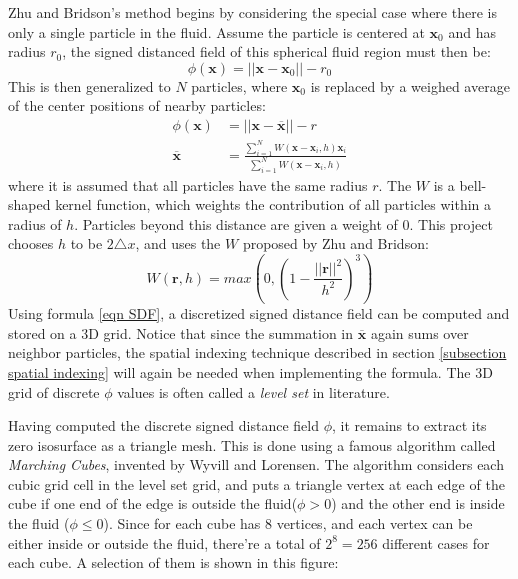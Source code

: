 Zhu and Bridson's method\cite{zhu2005animating} begins by considering the special case where there is only a single particle in the fluid. Assume the particle is centered at $\textbf{x}_0$ and has radius $r_0$, the signed distanced field of this spherical fluid region must then be:
$$
\phi(\textbf{x}) = ||\textbf{x}-\textbf{x}_0|| - r_0
$$
This is then generalized to $N$ particles, where $\textbf{x}_0$ is replaced by a weighed average of the center positions of nearby particles:
\begin{equation}
    \label{eqn SDF}
    \begin{aligned}
        \phi(\textbf{x}) &= ||\textbf{x}-\overline{\textbf{x}}|| - r \\
        \overline{\textbf{x}}&= \frac{\sum_{i=1}^{N} W(\textbf{x}-\textbf{x}_i,h)\textbf{x}_i}{\sum_{i=1}^{N} W(\textbf{x}-\textbf{x}_i,h)}
    \end{aligned}
\end{equation}
where it is assumed that all particles have the same radius $r$. The $W$ is a bell-shaped kernel function, which weights the contribution of all particles within a radius of $h$. Particles beyond this distance are given a weight of $0$. This project chooses $h$ to be $2\triangle x$, and uses the $W$ proposed by Zhu and Bridson:
$$
W(\textbf{r},h) = max(0,(1-\frac{||\textbf{r}||^2}{h^2})^3) 
$$
Using formula \ref{eqn SDF}, a discretized signed distance field can be computed and stored on a 3D grid. Notice that since the summation in $\overline{\textbf{x}}$ again sums over neighbor particles, the spatial indexing technique described in section \ref{subsection spatial indexing} will again be needed when implementing the formula. The 3D grid of discrete $\phi$ values is often called a \textit{level set} in literature\cite{bridson2015fluid}.


Having computed the discrete signed distance field $\phi$, it remains to extract its zero isosurface as a triangle mesh. This is done using a famous algorithm called \textit{Marching Cubes}, invented by Wyvill\cite{wyvill1986soft} and Lorensen\cite{lorensen1987marching}. The algorithm considers each cubic grid cell in the level set grid, and puts a triangle vertex at each edge of the cube if one end of the edge is outside the fluid($\phi>0$) and the other end is inside the fluid ($\phi\leq 0$). Since for each cube has 8 vertices, and each vertex can be either inside or outside the fluid, there're a total of $2^8=256$ different cases for each cube. A selection of them is shown in this figure:

